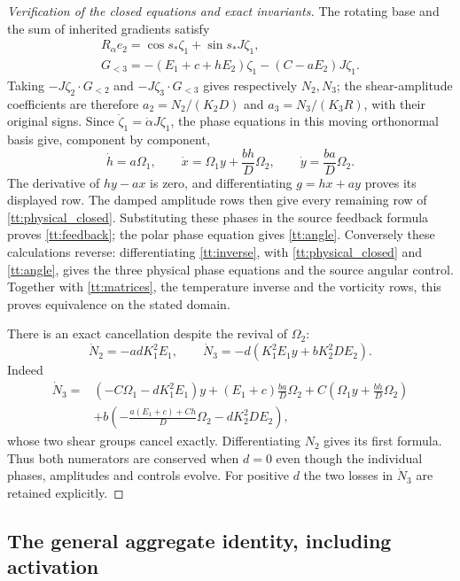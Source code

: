 \begin{proof}[Verification of the closed equations and exact invariants]
The rotating base and the sum of inherited gradients satisfy
\begin{gather*}
 R_\alpha e_2=\cos s_*\zeta_1+\sin s_*J\zeta_1,\\
 G_{<3}=-(E_1+c+hE_2)\zeta_1-(C-aE_2)J\zeta_1.
\end{gather*}
Taking $-J\zeta_2\cdot G_{<2}$ and
$-J\zeta_3\cdot G_{<3}$ gives respectively $N_2,N_3$;
the shear-amplitude coefficients are therefore
$a_2=N_2/(K_2D)$ and $a_3=N_3/(K_3R)$, with their original
signs. Since $\dot\zeta_1=\dot\alpha J\zeta_1$, the phase
equations in this moving orthonormal basis give, component by component,
\[
 \dot h=a\Omega_1,\qquad
 \dot x=\Omega_1y+\frac{bh}{D}\Omega_2,\qquad
 \dot y=\frac{ba}{D}\Omega_2.
\]
The derivative of $hy-ax$ is zero, and differentiating $g=hx+ay$
proves its displayed row. The damped amplitude rows then give every
remaining row of \eqref{tt:physical_closed}. Substituting these phases
in the source feedback formula proves \eqref{tt:feedback}; the polar
phase equation gives \eqref{tt:angle}. Conversely these calculations
reverse: differentiating \eqref{tt:inverse}, with
\eqref{tt:physical_closed} and \eqref{tt:angle}, gives the three
physical phase equations and the source angular control. Together with
\eqref{tt:matrices}, the temperature inverse and the vorticity rows,
this proves equivalence on the stated domain.

There is an exact cancellation despite the revival of $\Omega_2$:
\begin{equation}\label{tt:numerator_derivatives}
 \dot N_2=-adK_1^2E_1,\qquad
 \dot N_3=-d(K_1^2E_1y+bK_2^2DE_2).
\end{equation}
Indeed
\[
\begin{aligned}
 \dot N_3={}&(-C\Omega_1-dK_1^2E_1)y
 +(E_1+c)\frac{ba}{D}\Omega_2
 +C\left(\Omega_1y+\frac{bh}{D}\Omega_2\right)\\
 &+b\left(-\frac{a(E_1+c)+Ch}{D}\Omega_2-dK_2^2DE_2\right),
\end{aligned}
\]
whose two shear groups cancel exactly. Differentiating $N_2$ gives
its first formula. Thus both numerators are conserved when $d=0$
even though the individual phases, amplitudes and controls evolve.
For positive $d$ the two losses in $\dot N_3$ are retained explicitly.
\end{proof}

\subsection{The general aggregate identity, including activation}

